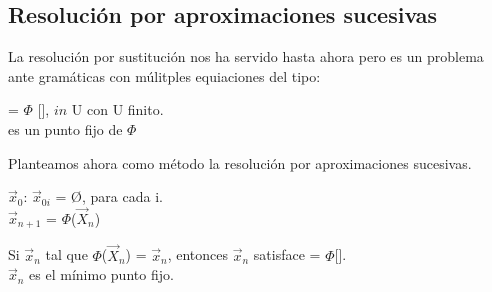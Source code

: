 \documentclass[\main/ApuntesPL.tex]{subfiles}
\begin{document}
    \subsection{Resolución por aproximaciones sucesivas}
      \par
      La resolución por sustitución nos ha servido hasta ahora pero es un problema ante gramáticas
      con múlitples equiaciones del tipo:
      \begin{center}
        \hspace{1mm} = $\Phi$ [],  $in$ U
        con U finito.\\
        \hspace{1mm} es un punto fijo de $\Phi$
      \end{center}

      \par
      Planteamos ahora como método la resolución por aproximaciones sucesivas.
      \begin{center}
        \hspace{1mm}$\overrightarrow{x}_0$: $\overrightarrow{x}_{0 i}$ = \O, para cada i.\\
        \hspace{1mm}$\overrightarrow{x}_{n+1}$ = $\Phi$($\overrightarrow{X}_n$)
      \end{center}
      Si $\overrightarrow{x}_n$ tal que $\Phi$($\overrightarrow{X}_n$) =
      $\overrightarrow{x}_n$, entonces $\overrightarrow{x}_n$ satisface  =
      $\Phi$[].\\
      $\overrightarrow{x}_n$ es el mínimo punto fijo.
\end{document}
